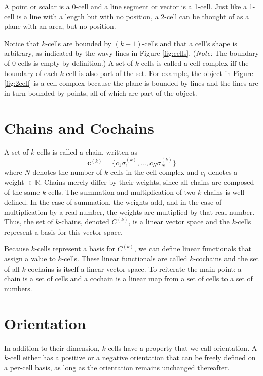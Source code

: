 A point or scalar is a 0-cell and a line segment or vector is a 1-cell. Just like a 1-cell is a line with a length but with no position, a 2-cell can be thought of as a plane with an area, but no position.

Notice that $k$-cells are bounded by $(k-1)$-cells and that a cell's shape is arbitrary, as indicated by the wavy lines in Figure \ref{fig:cells}. (\textit{Note:} The boundary of 0-cells is empty by definition.) A set of $k$-cells is called a cell-complex iff the boundary of each $k$-cell is also part of the set. For example, the object in Figure \ref{fig:2cell} is a cell-complex because the plane is bounded by lines and the lines are in turn bounded by points, all of which are part of the object.

\section{Chains and Cochains}

A set of $k$-cells is called a chain, written as
\begin{equation}
    \mathbf{c}^{(k)} = \{c_1 \sigma^{(k)}_1, \ldots, c_N \sigma^{(k)}_N \}
\end{equation}
where $N$ denotes the number of $k$-cells in the cell complex and $c_i$ denotes a weight $\in \mathbb{R}$. Chains merely differ by their weights, since all chains are composed of the same $k$-cells. The summation and multiplication of two $k$-chains is well-defined. In the case of summation, the weights add, and in the case of multiplication by a real number, the weights are multiplied by that real number. Thus, the set of $k$-chains, denoted $C^{(k)}$, is a linear vector space and the $k$-cells represent a basis for this vector space.

Because $k$-cells represent a basis for $C^{(k)}$, we can define linear functionals that assign a value to $k$-cells. These linear functionals are called $k$-cochains and the set of all $k$-cochains is itself a linear vector space. To reiterate the main point: a chain is a set of cells and a cochain is a linear map from a set of cells to a set of numbers.

\section{Orientation}

In addition to their dimension, $k$-cells have a property that we call orientation. A $k$-cell either has a positive or a negative orientation that can be freely defined on a per-cell basis, as long as the orientation remains unchanged thereafter. 


